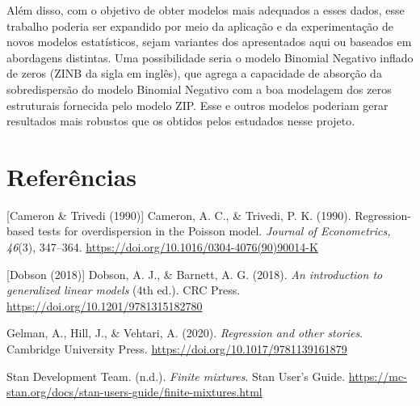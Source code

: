\documentclass[
  twocolumn]{article}
\begin{document}
Além disso, com o objetivo de obter modelos mais adequados a esses
dados, esse trabalho poderia ser expandido por meio da aplicação e da
experimentação de novos modelos estatísticos, sejam variantes dos
apresentados aqui ou baseados em abordagens distintas. Uma possibilidade
seria o modelo Binomial Negativo inflado de zeros (ZINB da sigla em
inglês), que agrega a capacidade de absorção da sobredispersão do modelo
Binomial Negativo com a boa modelagem dos zeros estruturais fornecida
pelo modelo ZIP. Esse e outros modelos poderiam gerar resultados mais
robustos que os obtidos pelos estudados nesse projeto.

\section{Referências}\label{referuxeancias}

{[}Cameron \& Trivedi (1990){]} Cameron, A. C., \& Trivedi, P. K.
(1990). Regression-based tests for overdispersion in the Poisson model.
\emph{Journal of Econometrics, 46}(3), 347--364.
\url{https://doi.org/10.1016/0304-4076(90)90014-K}

{[}Dobson (2018){]} Dobson, A. J., \& Barnett, A. G. (2018). \emph{An
introduction to generalized linear models} (4th ed.). CRC Press.
\url{https://doi.org/10.1201/9781315182780}

Gelman, A., Hill, J., \& Vehtari, A. (2020). \emph{Regression and other
stories}. Cambridge University Press.
\url{https://doi.org/10.1017/9781139161879}

Stan Development Team. (n.d.). \emph{Finite mixtures}. Stan User's
Guide.
\url{https://mc-stan.org/docs/stan-users-guide/finite-mixtures.html}
\end{document}
